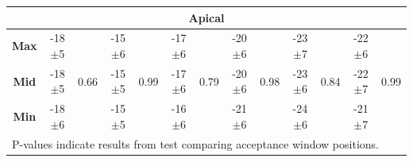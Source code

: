 \begin{table}
\begin{tabular}{ccccccccccccc}
			\multicolumn{13}{c}{\textbf{Apical}} \\
			\midrule
			\textbf{Max} & -18$\pm$5 & \multirow{3}{*}{0.66} & -15$\pm$6 & \multirow{3}{*}{0.99} & -17$\pm$6 & \multirow{3}{*}{0.79}
			& -20$\pm$6 & \multirow{3}{*}{0.98} & -23$\pm$7 & \multirow{3}{*}{0.84} & -22$\pm$6 & \multirow{3}{*}{0.99} \\
			\textbf{Mid} & -18$\pm$5 &                       & -15$\pm$5 &                       & -17$\pm$6 & 
			& -20$\pm$6 &                       & -23$\pm$6 &                       & -22$\pm$7 &                       \\
			\textbf{Min} & -18$\pm$6 &                       & -15$\pm$5 &                       & -16$\pm$6 & 
			& -21$\pm$6 &                       & -24$\pm$6 &                       & -21$\pm$7 & \\ 
			\bottomrule
			\multicolumn{13}{l}{P-values indicate results from test comparing acceptance window positions.}
		\end{tabular}
	\end{table}
	
